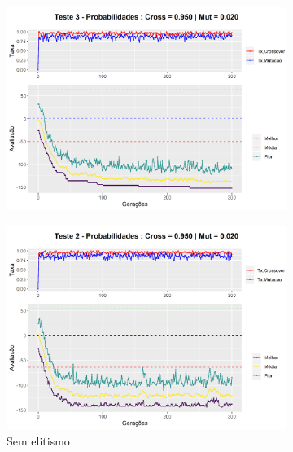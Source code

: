 \begin{figure}[ht]
\begin{subfigure}[b]{0.47\linewidth}
		\caption{}
	\end{subfigure}
	\begin{subfigure}[b]{0.47\linewidth}
		\includegraphics[width=\linewidth]{imagens/graph_pc_0_950_pm_0_020_pop_50_g_300__3.png}
		\caption{}
	\end{subfigure}
	\begin{subfigure}[b]{0.47\linewidth}
		\includegraphics[width=\linewidth]{imagens/graph_pc_0_950_pm_0_020_pop_50_g_300__2_noelite.png}
		\caption{Sem elitismo}
	\end{subfigure}
	\begin{subfigure}[b]{0.47\linewidth}

\end{subfigure}
\end{figure}
